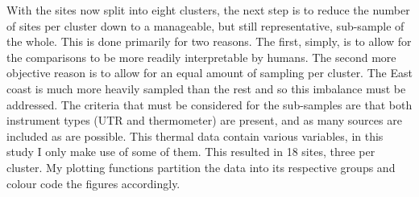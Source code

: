 \documentclass[10pt,A4,]{article}
\newenvironment{Shaded}{\begin{snugshade}}{\end{snugshade}}
\newcommand{\KeywordTok}[1]{\textcolor[rgb]{0.13,0.29,0.53}{\textbf{#1}}}
\newcommand{\DataTypeTok}[1]{\textcolor[rgb]{0.13,0.29,0.53}{#1}}
\newcommand{\DecValTok}[1]{\textcolor[rgb]{0.00,0.00,0.81}{#1}}
\newcommand{\StringTok}[1]{\textcolor[rgb]{0.31,0.60,0.02}{#1}}
\newcommand{\OperatorTok}[1]{\textcolor[rgb]{0.81,0.36,0.00}{\textbf{#1}}}
\newcommand{\NormalTok}[1]{#1}
\begin{document}
\begin{Shaded}
\end{Shaded}

With the sites now split into eight clusters, the next step is to reduce
the number of sites per cluster down to a manageable, but still
representative, sub-sample of the whole. This is done primarily for two
reasons. The first, simply, is to allow for the comparisons to be more
readily interpretable by humans. The second more objective reason is to
allow for an equal amount of sampling per cluster. The East coast is
much more heavily sampled than the rest and so this imbalance must be
addressed. The criteria that must be considered for the sub-samples are
that both instrument types (UTR and thermometer) are present, and as
many sources are included as are possible. This thermal data contain
various variables, in this study I only make use of some of them. This
resulted in 18 sites, three per cluster. My plotting functions partition
the data into its respective groups and colour code the figures
accordingly.
\end{document}
